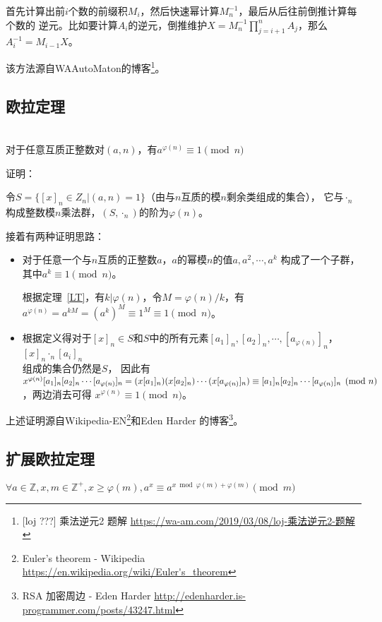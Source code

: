 首先计算出前$i$个数的前缀积$M_i$，然后快速幂计算$M_n^{-1}$，最后从后往前倒推计算每个数的
逆元。比如要计算$A_i$的逆元，倒推维护$X=M_n^{-1}\prod_{j=i+1}^n{A_j}$，那么
$A_i^{-1}=M_{i-1}X$。

该方法源自WAAutoMaton的博客\footnote{
	[loj ???] 乘法逆元2 题解
	\url{https://wa-am.com/2019/03/08/loj-乘法逆元2-题解}
}。
\subsection{欧拉定理}
\begin{theorem}\label{ET}
	~\\
	对于任意互质正整数对$(a,n)$，有$a^{\varphi(n)} \equiv 1 \pmod{n}$
\end{theorem}
证明：

令$S=\{[x]_n\in Z_n|(a,n)=1\}$（由与$n$互质的模$n$剩余类组成的集合），
它与$\cdot_n$构成整数模$n$乘法群，$(S,\cdot_n)$的阶为$\varphi(n)$。

接着有两种证明思路：
\begin{itemize}
	\item 对于任意一个与$n$互质的正整数$a$，$a$的幂模$n$的值$a,a^2,\cdots,a^k$
	      构成了一个子群，其中$a^k\equiv 1 \pmod{n}$。

	      根据定理~\ref{LT}，有$k|\varphi(n)$，令$M=\varphi(n)/k$，有
	      $a^{\varphi(n)}=a^{kM}=(a^k)^M\equiv 1^M\equiv 1 \pmod{n}$。
	\item 根据定义得对于$[x]_n\in S$和$S$中的所有元素$[a_1]_n,[a_2]_n,\cdots,
		[a_{\varphi(n)}]_n$，$[x]_n \cdot_n [a_i]_n$\\组成的集合仍然是$S$，
		因此有$x^{\varphi(n)}[a_1]_n[a_2]_n\cdots[a_{\varphi(n)}]_n=
		(x[a_1]_n)(x[a_2]_n)\cdots\\(x[a_{\varphi(n)}]_n)\equiv[a_1]_n
		[a_2]_n\cdots[a_{\varphi(n)}]_n\pmod{n}$，两边消去可得
		$x^{\varphi(n)}\equiv 1\pmod{n}$。
\end{itemize}

上述证明源自Wikipedia-EN\footnote{Euler's theorem - Wikipedia
	\url{https://en.wikipedia.org/wiki/Euler's\_theorem}}和Eden Harder
的博客\footnote{RSA 加密周边 - Eden Harder
	\url{http://edenharder.is-programmer.com/posts/43247.html}}。
\subsection{扩展欧拉定理}
\begin{theorem}\label{exEuler}
	$\forall a\in \mathbb{Z},x,m\in \mathbb{Z^+},x\geq \varphi(m)
		,a^x\equiv a^{x \bmod \varphi(m)+\varphi(m)} \pmod{m}$
\end{theorem}

